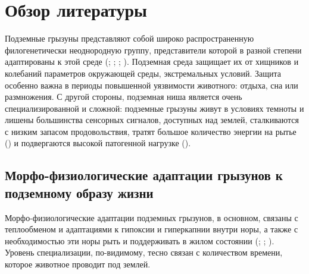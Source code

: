 \chapter{Обзор литературы} \label{lit_review}


Подземные грызуны представляют собой широко распространенную филогенетически неоднородную группу, представители которой в разной степени адаптированы к этой среде (\cite{Nevo1990}; \cite{Nevo1999}; \cite{Lacey2000}; \cite{Begall2007}). Подземная среда защищает их от хищников и колебаний параметров окружающей среды, экстремальных условий. Защита особенно важна в периоды повышенной уязвимости животного: отдыха, сна или размножения. С другой стороны, подземная ниша является очень специализированной и сложной: подземные грызуны живут в условиях темноты и лишены большинства сенсорных сигналов, доступных над землей, сталкиваются с низким запасом продовольствия, тратят большое количество энергии на рытье (\cite{Begall2007}) и подвергаются высокой патогенной нагрузке (\cite{Nevo1999}).


\section{Морфо-физиологические адаптации грызунов к подземному образу жизни}

Морфо-физиологические адаптации подземных грызунов, в основном, связаны с теплообменом и адаптациями к гипоксии и гиперкапнии внутри норы, а также с необходимостью эти норы рыть и поддерживать в жилом состоянии (\cite{Gambaryan1957}; \cite{Nevo1999}; \cite{McNab1966}). Уровень специализации, по-видимому, тесно связан с количеством времени, которое животное проводит под землей. 


